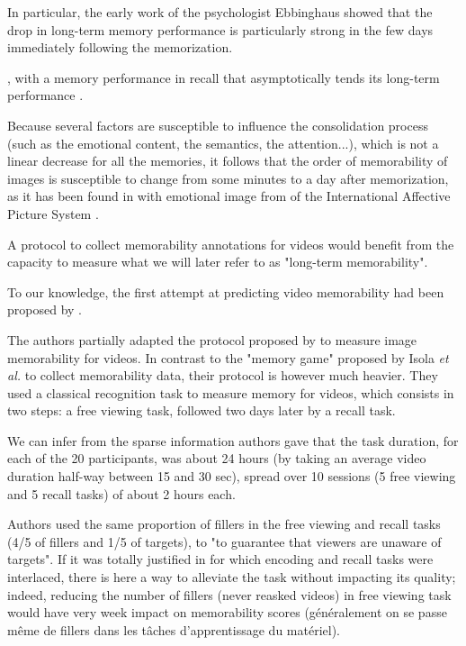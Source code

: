 \documentclass[sigconf]{acmart}
\begin{document}
In particular, the early work of the psychologist Ebbinghaus showed that the drop in long-term memory performance is particularly strong in the few days immediately following the memorization.

, with a memory performance in recall that asymptotically tends its long-term performance \cite{ebbinghaus_1913_memory}.

Because several factors are susceptible to influence the consolidation process (such as the emotional content, the semantics, the attention...), which is not a linear decrease for all the memories, it follows that the order of memorability of images is susceptible to change from some minutes to a day after memorization, as it has been found in \cite{cohendet_2016_prediction} with emotional image from of the International Affective Picture System \cite{lang_2005_international}.

A protocol to collect memorability annotations for videos would benefit from the capacity to measure what we will later refer to as "long-term memorability".



To our knowledge, the first attempt at predicting video memorability had been proposed by \cite{han_2015_learning}. 


The authors partially adapted the protocol proposed by \cite{isola_2011_makes} to measure image memorability for videos.
In contrast to the "memory game" proposed by Isola \textit{et al.} to collect memorability data, their protocol is however much heavier. 
They used a classical recognition task to measure memory for videos, which consists in two steps: a free viewing task, followed two days later by a recall task.

We can infer from the sparse information authors gave that the task duration, for each of the 20 participants, was about 24 hours (by taking an average video duration half-way between 15 and 30 sec), spread over 10 sessions (5 free viewing and 5 recall tasks) of about 2 hours each.

Authors used the same proportion of fillers in the free viewing and recall tasks (4/5 of fillers and 1/5 of targets), to "to guarantee that viewers are unaware of targets". If it was totally justified in \cite{isola_2011_makes} for which encoding and recall tasks were interlaced, there is here a way to alleviate the task without impacting its quality; indeed, reducing the number of fillers (never reasked videos) in free viewing task would have very week impact on memorability scores (généralement on se passe même de fillers dans les tâches d'apprentissage du matériel).
\end{document}
